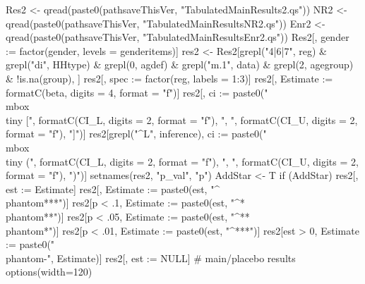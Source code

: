 \begin{Schunk}
\begin{Sinput}
Res2 <- qread(paste0(pathsaveThisVer, "TabulatedMainResults2.qs"))
NR2 <- qread(paste0(pathsaveThisVer, "TabulatedMainResultsNR2.qs"))
Enr2 <- qread(paste0(pathsaveThisVer, "TabulatedMainResultsEnr2.qs"))
Res2[, gender := factor(gender, levels = genderitems)]
res2 <- Res2[grepl("4|6|7", reg) & grepl("di", HHtype) & 
  grepl(0, agdef) & grepl("m.1", data) & grepl(2, agegroup) & !is.na(group), ]
res2[, spec := factor(reg, labels = 1:3)]
res2[, Estimate := formatC(beta, digits = 4, format = "f")]
res2[, ci := paste0("\\mbox{\\tiny [", 
  formatC(CI_L, digits = 2, format = "f"), ", ", 
  formatC(CI_U, digits = 2, format = "f"), "]}")]
res2[grepl("^L", inference), ci := paste0("\\mbox{\\tiny (", 
  formatC(CI_L, digits = 2, format = "f"), ", ", 
  formatC(CI_U, digits = 2, format = "f"), ")}")]
setnames(res2, "p_val", "p")
AddStar <- T
if (AddStar) {
  res2[, est := Estimate]
  res2[, Estimate := paste0(est, "^{\\phantom{***}}")]
  res2[p < .1, Estimate := paste0(est, "^{*\\phantom{**}}")]
  res2[p < .05, Estimate := paste0(est, "^{**\\phantom{*}}")]
  res2[p < .01, Estimate := paste0(est, "^{***}")]
  res2[est > 0, Estimate := paste0("\\phantom{-}", Estimate)]
  res2[, est := NULL]
}
# main/placebo results
options(width=120)


\end{Sinput}
\end{Schunk}
